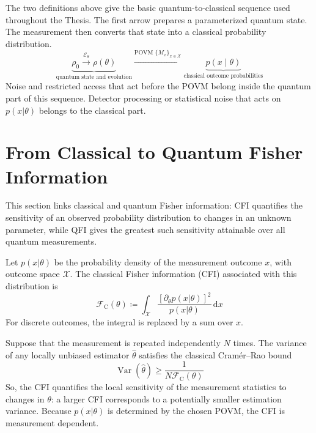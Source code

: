 The two definitions above give the basic quantum-to-classical sequence used throughout the Thesis.  The first arrow prepares a parameterized quantum state.  The measurement then converts that state into a classical probability distribution.
\begin{equation}
    \underbrace{
        \rho_0
        \xrightarrow{\mathcal{E}_\theta}
        \rho(\theta)
    }_{\text{quantum state and evolution}}
    \xrightarrow{\text{POVM }\{M_x\}_{x\in\mathcal{X}}}
    \underbrace{
        p(x\mid\theta)
    }_{\text{classical outcome probabilities}}
    \label{eq:quantum_to_classical_sequence}
\end{equation}
Noise and restricted access that act before the POVM belong inside the quantum part of this sequence.  Detector processing or statistical noise that acts on $p(x|\theta)$ belongs to the classical part.

\section{From Classical to Quantum Fisher Information}

This section links classical and quantum Fisher information: CFI quantifies the sensitivity of an observed probability distribution to changes in an unknown parameter, while QFI gives the greatest such sensitivity attainable over all quantum measurements.

\begin{definition}
    Let $p(x|\theta)$ be the probability density of the measurement outcome $x$, with outcome space $\mathcal{X}$. The classical Fisher information (CFI) associated with this distribution is
    \begin{equation}
        \mathcal{F}_{\mathrm{C}}(\theta)
        \coloneqq
        \int_{\mathcal{X}}
        \frac{\left[\partial_\theta p(x|\theta)\right]^2}
        {p(x|\theta)}
        \,\mathrm{d}x
        \label{eq:classical_fi}
    \end{equation}
    For discrete outcomes, the integral is replaced by a sum over $x$.
\end{definition}

\begin{remark}
    Suppose that the measurement is repeated independently $N$ times. The variance of any locally unbiased estimator $\hat{\theta}$ satisfies the classical Cramér--Rao bound
    \begin{equation}
        \operatorname{Var}(\hat{\theta})
        \geq
        \frac{1}{N\mathcal{F}_{\mathrm{C}}(\theta)}
    \end{equation}
    So, the CFI quantifies the local sensitivity of the measurement statistics to changes in $\theta$: a larger CFI corresponds to a potentially smaller estimation variance. Because $p(x|\theta)$ is determined by the chosen POVM, the CFI is measurement dependent.
\end{remark}

